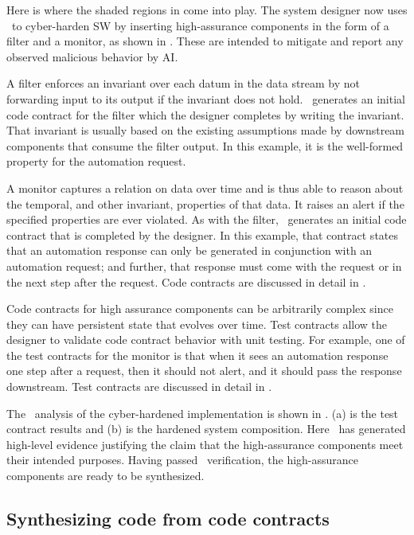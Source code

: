 Here is where the shaded regions in  come into play.
The system designer now uses \brfcs\ to cyber-harden SW by inserting
high-assurance components in the form of a filter and a monitor, as
shown in .
These are intended to mitigate and report any observed malicious behavior by AI.

A filter enforces an invariant over
each datum in the data stream by not forwarding input to its output if the invariant does not hold.
\brfcs\ generates an initial code contract for the filter which the designer completes by writing the invariant.
That invariant is usually based on the existing assumptions made by
downstream components that consume the filter output.
In this example, it is the well-formed property for the automation request.

A monitor captures a relation on data over time and is thus able
to reason about the temporal, and other invariant, properties of that data.  It raises
an alert if the specified properties are ever violated.  
As with the filter, \brfcs\ generates an initial code contract that is completed by the designer. 
In this example, that contract states that an
automation response can only be generated in conjunction with an
automation request; and further, that response must come with the
request or in the next step after the request.  
Code contracts are discussed in detail in .

Code contracts for high assurance components can be arbitrarily complex since they can have persistent state that evolves over time.
Test contracts allow the designer to validate code contract behavior with unit testing.
For example, one of the test contracts for the monitor is that when it sees an automation response one step after a request, then it should not alert, and it should pass the response downstream.
Test contracts are discussed in detail in .

The \agr\ analysis of the cyber-hardened implementation is shown in
.
(a) is the test contract results and (b) is the hardened system composition.
Here \agr\ has generated high-level
evidence justifying the claim that the high-assurance components meet their intended purposes.
Having passed \agr\ verification, the high-assurance components are ready to be
synthesized.

\subsection{Synthesizing code from code contracts}

